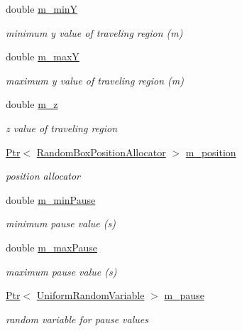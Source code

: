 \begin{DoxyCompactItemize}
double \hyperlink{classns3_1_1SteadyStateRandomWaypointMobilityModel_aa208b74985a3dfd89206e0fbf582186f}{m\+\_\+minY}
\begin{DoxyCompactList}\small\item\em minimum y value of traveling region (m) \end{DoxyCompactList}\item 
double \hyperlink{classns3_1_1SteadyStateRandomWaypointMobilityModel_aebede763f8363a98d153a19523d0a131}{m\+\_\+maxY}
\begin{DoxyCompactList}\small\item\em maximum y value of traveling region (m) \end{DoxyCompactList}\item 
double \hyperlink{classns3_1_1SteadyStateRandomWaypointMobilityModel_a702c7ffbfca3cea2b53e5fe671fd973d}{m\+\_\+z}
\begin{DoxyCompactList}\small\item\em z value of traveling region \end{DoxyCompactList}\item 
\hyperlink{classns3_1_1Ptr}{Ptr}$<$ \hyperlink{classns3_1_1RandomBoxPositionAllocator}{Random\+Box\+Position\+Allocator} $>$ \hyperlink{classns3_1_1SteadyStateRandomWaypointMobilityModel_af99538149102b89057259be27bd6d59e}{m\+\_\+position}
\begin{DoxyCompactList}\small\item\em position allocator \end{DoxyCompactList}\item 
double \hyperlink{classns3_1_1SteadyStateRandomWaypointMobilityModel_a2f2c459cb15ccdc6b1ca7b189b48f2b4}{m\+\_\+min\+Pause}
\begin{DoxyCompactList}\small\item\em minimum pause value (s) \end{DoxyCompactList}\item 
double \hyperlink{classns3_1_1SteadyStateRandomWaypointMobilityModel_a8986b6ac8a22e230e7596763d973af07}{m\+\_\+max\+Pause}
\begin{DoxyCompactList}\small\item\em maximum pause value (s) \end{DoxyCompactList}\item 
\hyperlink{classns3_1_1Ptr}{Ptr}$<$ \hyperlink{classns3_1_1UniformRandomVariable}{Uniform\+Random\+Variable} $>$ \hyperlink{classns3_1_1SteadyStateRandomWaypointMobilityModel_a46c20c9985a424aba9486dfb34a39579}{m\+\_\+pause}
\begin{DoxyCompactList}\small\item\em random variable for pause values \end{DoxyCompactList}\item 

\end{DoxyCompactItemize}
